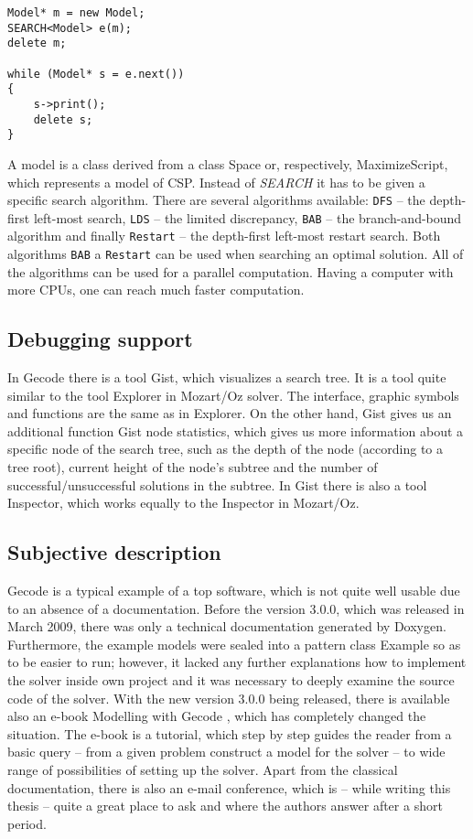 \begin{verbatim}
Model* m = new Model;	
SEARCH<Model> e(m);
delete m;

while (Model* s = e.next())
{
	s->print();
	delete s;
}  
\end{verbatim}

A model is a class derived from a class Space or, respectively, MaximizeScript, which
represents a model of CSP. Instead of {\em SEARCH} it has to be given a specific search
algorithm. There are several algorithms available: \texttt{DFS} -- the depth-first left-most search, \texttt{LDS} -- the limited discrepancy,
\texttt{BAB} -- the branch-and-bound algorithm and finally \texttt{Restart} -- the depth-first left-most
restart search. Both algorithms \texttt{BAB} a \texttt{Restart} can be used when 
searching an optimal solution. All of the algorithms can be used for a parallel computation.
Having a computer with more CPUs, one can reach much faster computation.

\subsection{Debugging support}
In Gecode there is a tool Gist, which visualizes a search tree. It is a tool quite 
similar to the tool Explorer in Mozart/Oz solver. The interface, graphic symbols and
functions are the same as in Explorer. On the other hand, Gist gives us an additional 
function Gist node statistics, which gives us more information about a specific node 
of the search tree, such as the depth of the node (according to a tree root), current height
of the node's subtree and the number of successful/unsuccessful solutions in the subtree.
In Gist there is also a tool Inspector, which works equally to the Inspector in Mozart/Oz.
   

\subsection{Subjective description}
Gecode is a typical example of a top software, which is not quite well usable due to
an absence of a documentation. Before the version 3.0.0, which was released in March 2009, there
was only a technical documentation generated by Doxygen. Furthermore, the example models were 
sealed into a pattern class Example so as to be easier to run; however, it lacked any further 
explanations how to implement the solver inside own project and it was necessary to deeply
examine the source code of the solver. With the new version 3.0.0 being released, there is
available also an e-book Modelling with Gecode \cite{gecode:modelling}, which has completely changed
the situation. The e-book is a tutorial, which step by step guides the reader from a basic 
query -- from a given problem construct a model for the solver -- to wide range of possibilities
of setting up the solver. Apart from the classical documentation, there is also an e-mail conference,
which is -- while writing this thesis -- quite a great place to ask and where the authors
answer after a short period.
